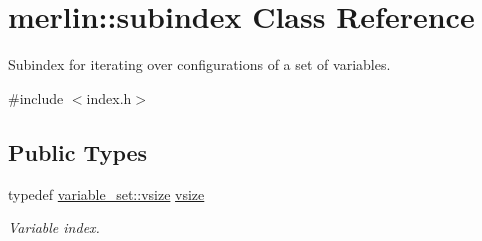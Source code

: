 \hypertarget{classmerlin_1_1subindex}{}\section{merlin\+:\+:subindex Class Reference}
\label{classmerlin_1_1subindex}


Subindex for iterating over configurations of a set of variables.  




{\ttfamily \#include $<$index.\+h$>$}

\subsection*{Public Types}
\begin{DoxyCompactItemize}
\item 
typedef \hyperlink{classmerlin_1_1variable__set_a05d7a8291564fa7fb236a5e9cb65c734}{variable\+\_\+set\+::vsize} \hyperlink{classmerlin_1_1subindex_a85a7fddb94bd83a77a4a73293c5d613a}{vsize}\hypertarget{classmerlin_1_1subindex_a85a7fddb94bd83a77a4a73293c5d613a}{}\label{classmerlin_1_1subindex_a85a7fddb94bd83a77a4a73293c5d613a}

\begin{DoxyCompactList}\small\item\em Variable index. \end{DoxyCompactList}\end{DoxyCompactItemize}

